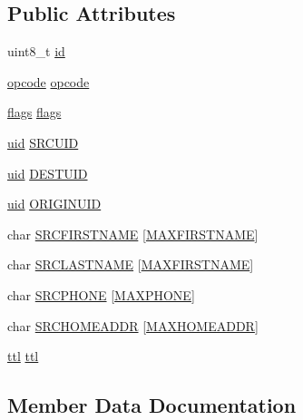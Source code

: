 \subsection*{Public Attributes}
\begin{DoxyCompactItemize}
\item 
uint8\+\_\+t \hyperlink{struct_packet_a5167d164b320ac43373775bbf1546d2f}{id}
\item 
\hyperlink{haha_utils_8h_a5ce68aceddf17a30aa045fc04914e798}{opcode} \hyperlink{struct_packet_add7e8d0db5c932cdf6ff0252697b88b0}{opcode}
\item 
\hyperlink{flags_8h_a261da8bdf9ce262f07bc17c9b2834bb5}{flags} \hyperlink{struct_packet_a06b33fa705a08bf26d8f15f4e5a5eacc}{flags}
\item 
\hyperlink{haha_utils_8h_ac065f913fb79988aec421b0f5eebbc77}{uid} \hyperlink{struct_packet_a3cef7ca885da48680c0646ae307db4a4}{S\+R\+C\+U\+ID}
\item 
\hyperlink{haha_utils_8h_ac065f913fb79988aec421b0f5eebbc77}{uid} \hyperlink{struct_packet_ad4f0e5f73729e408a82f9792c67680d2}{D\+E\+S\+T\+U\+ID}
\item 
\hyperlink{haha_utils_8h_ac065f913fb79988aec421b0f5eebbc77}{uid} \hyperlink{struct_packet_aa3bf059f5b682b83661111cb32720455}{O\+R\+I\+G\+I\+N\+U\+ID}
\item 
char \hyperlink{struct_packet_a0001fb805cfd15a0776622ff27135a02}{S\+R\+C\+F\+I\+R\+S\+T\+N\+A\+ME} \mbox{[}\hyperlink{haha_utils_8h_ac3dd1c10edba39fc5737be5b96a91d2a}{M\+A\+X\+F\+I\+R\+S\+T\+N\+A\+ME}\mbox{]}
\item 
char \hyperlink{struct_packet_a2499b774247b7a099cf3878265d23a2f}{S\+R\+C\+L\+A\+S\+T\+N\+A\+ME} \mbox{[}\hyperlink{haha_utils_8h_ac3dd1c10edba39fc5737be5b96a91d2a}{M\+A\+X\+F\+I\+R\+S\+T\+N\+A\+ME}\mbox{]}
\item 
char \hyperlink{struct_packet_ab1db398486aded3d3f00350f1ac77458}{S\+R\+C\+P\+H\+O\+NE} \mbox{[}\hyperlink{haha_utils_8h_a2f035f148b6abcc902e7711997c031d7}{M\+A\+X\+P\+H\+O\+NE}\mbox{]}
\item 
char \hyperlink{struct_packet_a4bac977ea6fbf7dd57a22398aa280fca}{S\+R\+C\+H\+O\+M\+E\+A\+D\+DR} \mbox{[}\hyperlink{haha_utils_8h_acc141dd006defc06f8e58a57259526f9}{M\+A\+X\+H\+O\+M\+E\+A\+D\+DR}\mbox{]}
\item 
\hyperlink{haha_utils_8h_a22ca626eb8f0deb847d1fae89476e26d}{ttl} \hyperlink{struct_packet_a63433ac4a59b48ac4c2dee5c330eb99d}{ttl}
\end{DoxyCompactItemize}


\subsection{Member Data Documentation}
\mbox{\label{struct_packet_ad4f0e5f73729e408a82f9792c67680d2}} 
